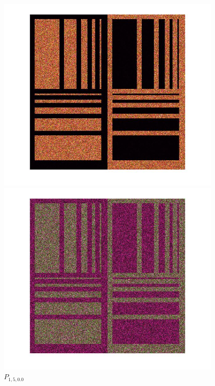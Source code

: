 \documentclass[12pt,a4paper]{article}
\begin{document}
\begin{figure}[!htb]
  \includegraphics[width=\linewidth]{Eq_Phantom_0p000_1_4_1.jpg}
	\caption{ $P_{1,4,0.0}$}\label{fig:awesome_image1}
\endminipage
{}%
  \includegraphics[width=\linewidth]{Eq_Phantom_0p000_1_5_1.jpg}
	\caption{ $P_{1,5,0.0}$}\label{fig:awesome_image1}
\endminipage
\end{figure}
\end{document}
